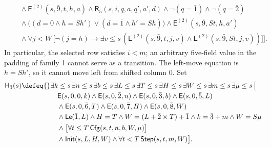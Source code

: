 \begin{definition}
\[\begin{aligned}
 &\quad\land\mathsf E^{(2)}(s,\bar9,t,h,a)
       \land\mathsf R_5(s,i,q,a,q',a',d)
       \land\neg(q=\bar1)\land\neg(q=\bar2)\\
 &\quad\land\bigl((d=0\land h=Sh')
                    \lor(d=\bar1\land h'=Sh)\bigr)
       \land\mathsf E^{(2)}(s,\bar9,St,h,a')\\
 &\quad\land\forall j<W\,
    \bigl[\neg(j=h)\to
      \exists v\leq s\,
       (\mathsf E^{(2)}(s,\bar9,t,j,v)
          \land\mathsf E^{(2)}(s,\bar9,St,j,v))\bigr]\bigr].
\end{aligned}
\]
In particular, the selected row satisfies \(i<m\); an arbitrary
five-field value in the padding of family 1 cannot serve as a transition.
The left-move equation is \(h=Sh'\), so it cannot move left from shifted
column \(0\).  Set
\[
\begin{aligned}
 \mathsf H_3(s)\defeq{}&
  \exists k\leq s\,\exists n\leq s\,\exists b\leq s\,
  \exists L\leq s\,\exists T\leq s\,\exists H\leq s\,
  \exists W\leq s\,\exists m\leq s\,\exists\mu\leq s\,\bigl[\\
 &\quad\mathsf E(s,0,0,k)\land\mathsf E(s,0,\bar2,n)
       \land\mathsf E(s,0,\bar3,b)\land\mathsf E(s,0,\bar5,L)\\
 &\quad\land\mathsf E(s,0,\bar6,T)\land\mathsf E(s,0,\bar7,H)
       \land\mathsf E(s,0,\bar8,W)\\
 &\quad\land\mathsf{Le}(\bar1,L)\land H=T
       \land W=(L+\bar2\times T)+\bar1
       \land k=\bar3+m\land W=S\mu\\
 &\quad\land\bigl[\forall t\leq T\,\mathsf{Cfg}(s,t,n,b,W,\mu)\bigr]\\
 &\quad\land\mathsf{Init}(s,L,H,W)
       \land\forall t<T\,\mathsf{Step}(s,t,m,W)\bigr].
\end{aligned}
\]


\end{definition}
